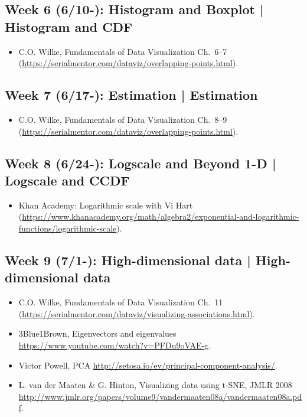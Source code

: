 \documentclass[11pt,article,oneside]{memoir} %
\begin{document}
\subsection{Week 6 (6/10-): Histogram and Boxplot | Histogram and CDF }%

\begin{itemize}\itemsep0em 
\item C.O. Wilke, Fundamentals of Data Visualization Ch.~6--7 (\url{https://serialmentor.com/dataviz/overlapping-points.html}). 
\end{itemize}	
\subsection{Week 7 (6/17-): Estimation | Estimation }%

\begin{itemize}\itemsep0em 
\item C.O. Wilke, Fundamentals of Data Visualization Ch.~8--9 (\url{https://serialmentor.com/dataviz/overlapping-points.html}). 
\end{itemize}	
\subsection{Week 8 (6/24-): Logscale and Beyond 1-D | Logscale and CCDF}%

\begin{itemize}\itemsep0em 
\item Khan Academy: Logarithmic scale with Vi Hart (\url{https://www.khanacademy.org/math/algebra2/exponential-and-logarithmic-functions/logarithmic-scale}). 
\end{itemize}	
\subsection{Week 9 (7/1-): High-dimensional data | High-dimensional data }%

\begin{itemize}\itemsep0em 
\item C.O. Wilke, Fundamentals of Data Visualization Ch.~11 (\url{https://serialmentor.com/dataviz/visualizing-associations.html}). 
\item 3Blue1Brown, Eigenvectors and eigenvalues \url{https://www.youtube.com/watch?v=PFDu9oVAE-g}. 
\item Victor Powell, PCA \url{http://setosa.io/ev/principal-component-analysis/}.
\item L. van der Maaten \& G. Hinton, Visualizing data using t-SNE, JMLR 2008 \url{http://www.jmlr.org/papers/volume9/vandermaaten08a/vandermaaten08a.pdf}.
\end{itemize}	
\end{document}
